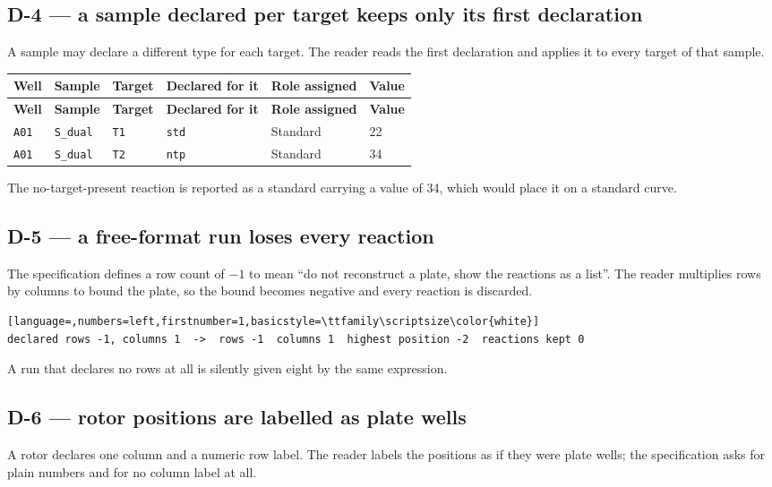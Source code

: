 \subsection*{D-4 --- a sample declared per target keeps only its first declaration}
A sample may declare a different type for each target. The reader reads the first
declaration and applies it to every target of that sample.

{\small
\begin{xltabular}{\linewidth}{|X|l|l|l|l|l|}
\toprule \textbf{Well} & \textbf{Sample} & \textbf{Target} & \textbf{Declared for it} & \textbf{Role assigned} & \textbf{Value} \\\midrule\endfirsthead
\toprule \textbf{Well} & \textbf{Sample} & \textbf{Target} & \textbf{Declared for it} & \textbf{Role assigned} & \textbf{Value} \\\midrule\endhead
\texttt{A01} & \texttt{S\_dual} & \texttt{T1} & \texttt{std} & Standard & 22 \\
\texttt{A01} & \texttt{S\_dual} & \texttt{T2} & \texttt{ntp} & Standard & 34 \\
\bottomrule
\end{xltabular}}


The no-target-present reaction is reported as a standard carrying a value of 34,
which would place it on a standard curve.

\subsection*{D-5 --- a free-format run loses every reaction}
The specification defines a row count of $-1$ to mean ``do not reconstruct a plate,
show the reactions as a list''. The reader multiplies rows by columns to bound the
plate, so the bound becomes negative and every reaction is discarded.

\begin{lstlisting}[language=,numbers=left,firstnumber=1,basicstyle=\ttfamily\scriptsize\color{white}]
declared rows -1, columns 1  ->  rows -1  columns 1  highest position -2  reactions kept 0
\end{lstlisting}


A run that declares no rows at all is silently given eight by the same expression.

\subsection*{D-6 --- rotor positions are labelled as plate wells}
A rotor declares one column and a numeric row label. The reader labels the
positions as if they were plate wells; the specification asks for plain numbers and
for no column label at all.

